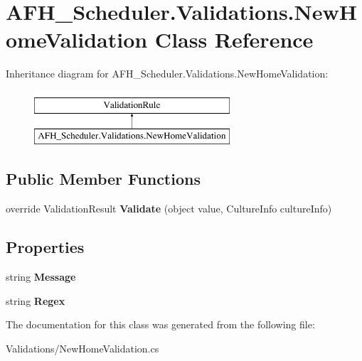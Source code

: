 \section{A\+F\+H\+\_\+\+Scheduler.\+Validations.\+New\+Home\+Validation Class Reference}
\label{class_a_f_h___scheduler_1_1_validations_1_1_new_home_validation}
Inheritance diagram for A\+F\+H\+\_\+\+Scheduler.\+Validations.\+New\+Home\+Validation\+:\begin{figure}[H]
\begin{center}
\leavevmode
\includegraphics[height=2.000000cm]{class_a_f_h___scheduler_1_1_validations_1_1_new_home_validation}
\end{center}
\end{figure}
\subsection*{Public Member Functions}
\begin{DoxyCompactItemize}
\item 
\mbox{\label{class_a_f_h___scheduler_1_1_validations_1_1_new_home_validation_a2d3b9c9abf3f1a79f5309aae7b21fcd9}} 
override Validation\+Result {\bfseries Validate} (object value, Culture\+Info culture\+Info)
\end{DoxyCompactItemize}
\subsection*{Properties}
\begin{DoxyCompactItemize}
\item 
\mbox{\label{class_a_f_h___scheduler_1_1_validations_1_1_new_home_validation_a5f6c02f4e050f15cafbee9376feea439}} 
string {\bfseries Message}\hspace{0.3cm}{\ttfamily  [get, set]}
\item 
\mbox{\label{class_a_f_h___scheduler_1_1_validations_1_1_new_home_validation_a8c9262bb2becf6444bd6c6525637f927}} 
string {\bfseries Regex}\hspace{0.3cm}{\ttfamily  [get, set]}
\end{DoxyCompactItemize}


The documentation for this class was generated from the following file\+:\begin{DoxyCompactItemize}
\item 
Validations/New\+Home\+Validation.\+cs\end{DoxyCompactItemize}
